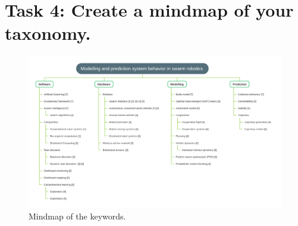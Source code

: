 \documentclass{article}
\begin{document}
\section*{Task 4: Create a mindmap of your taxonomy.}

\begin{figure}[h!]
  \includegraphics[width=\linewidth]{Robotics.png}
  \caption{Mindmap of the keywords.}
  \label{fig:rob}
\end{figure}



\end{document}
